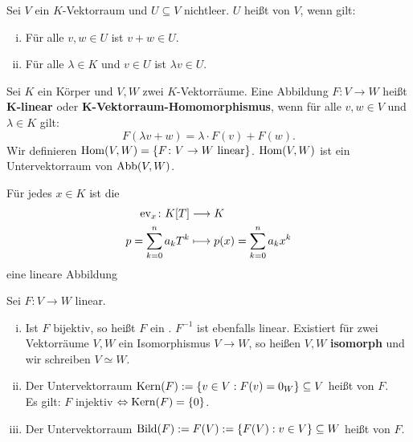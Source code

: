 \setcounter{definition}{3}
\begin{definition}[Untervektorraum]
	\label{def:I.5.4}
	Sei $V$ ein $K$-Vektorraum und $U \subseteq V$ nichtleer.
	$U$ heißt  von $V$, wenn gilt:
	\begin{enumerate}[(i)]
		\item Für alle $v,w \in U$ ist $v+w \in U$.
		\item Für alle $\lambda \in K$ und $v \in U$ ist $\lambda v \in U$.
	\end{enumerate}
\end{definition}

\setcounter{definition}{6}
\begin{definition}
	\label{def:I.5.7}
	Sei $K$ ein Körper und $V,W$ zwei $K$-Vektorräume.
	Eine Abbildung $F \colon V \rightarrow W$ heißt $\mathbf{K}$\textbf{-linear} oder $\mathbf{K}$\textbf{-Vektorraum-Homomorphismus}, wenn für alle $v,w \in V$ und $\lambda \in K$ gilt:
	\[
		F(\lambda v + w) = \lambda \cdot F(v) + F(w).
	\]
	Wir definieren $\operatorname{Hom}(V,W) = \{F \colon V \rightarrow W \text{ linear}\}$.
	$\operatorname{Hom}(V,W)$ ist ein Untervektorraum von $\operatorname{Abb}(V,W)$.
\end{definition}

\begin{beispiel}[Auswertungsabbildung]
	\label{bsp:I.5.8}
	Für jedes $x \in K$ ist die 
	\begin{align*}
		\operatorname{ev}_x \colon K[T] &\longrightarrow K \\
		p = \sum_{k=0}^{n} a_kT^k &\longmapsto p(x) = \sum_{k=0}^{n} a_kx^k
	\end{align*}
	eine lineare Abbildung
\end{beispiel}

\begin{definition}
	\label{def:I.5.9}
	Sei $F\colon V \rightarrow W$ linear.
	\begin{enumerate}[(i)]
		\item Ist $F$ bijektiv, so heißt $F$ ein .
		$F^{-1}$ ist ebenfalls linear.
		Existiert für zwei Vektorräume $V,W$ ein Isomorphismus $V \rightarrow W$, so heißen $V,W$ \textbf{isomorph} und wir schreiben $V \simeq W$.
		\item Der Untervektorraum $\operatorname{Kern}(F) := \{v \in V : F(v) = 0_W\} \subseteq V$ heißt  von $F$. \\
		Es gilt: $F$ injektiv $\Leftrightarrow \operatorname{Kern}(F) = \{0\}$.
		\item Der Untervektorraum $\operatorname{Bild}(F) := F(V) := \{F(V) : v \in V\} \subseteq W$ heißt  von $F$.
	\end{enumerate}
\end{definition}
\newpage